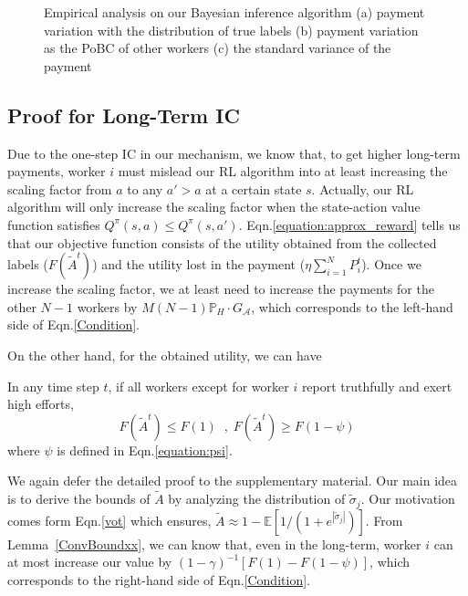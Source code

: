 \begin{figure}[!htb]
\begin{subfigure}[t]{0.32\textwidth}
        \caption{\label{BIM4}}
    \end{subfigure}
	\vspace{-3mm}
    \caption{\label{BIM}Empirical analysis on our Bayesian inference algorithm (a) payment variation with the distribution of true labels (b) payment variation as the PoBC of other workers (c) the standard variance of the payment}
\vspace{-4mm}
\end{figure}
\subsection{Proof for Long-Term IC}
Due to the one-step IC in our mechanism, we know that, to get higher long-term payments, worker $i$ must mislead our RL algorithm into at least increasing the scaling factor from $a$ to any $a'>a$ at a certain state $s$.
Actually, our RL algorithm will only increase the scaling factor when the state-action value function satisfies $Q^{\pi}(s,a)\leq Q^{\pi}(s,a')$.
Eqn.\ref{equation:approx_reward} tells us that our objective function consists of the utility obtained from the collected labels ($F(\tilde{A}^t)$) and the utility lost in the payment ($\eta {\sum}_{i=1}^{N}P^t_i$).
Once we increase the scaling factor, we at least need to increase the payments for the other $N-1$ workers by $M(N-1)\mathbb{P}_H\cdot G_{\mathcal{A}}$, which corresponds to the left-hand side of Eqn.\ref{Condition}.

On the other hand, for the obtained utility, we can have 
\begin{lemma}
\label{ConvBoundxx}
In any time step $t$, if all workers except for worker $i$ report truthfully and exert high efforts,
\begin{equation*}
F(\tilde{A}^t)\leq F(1) \;\;,\; F(\tilde{A}^t)\geq F(1-\psi)
\end{equation*}
where $\psi$ is defined in Eqn.\ref{equation:psi}.
\end{lemma}
We again defer the detailed proof to the supplementary material.
Our main idea is to derive the bounds of $\tilde{A}$ by analyzing the distribution of $\tilde{\sigma}_j$.
Our motivation comes form Eqn.\ref{vot} which ensures, $\tilde{A} \approx 1-\mathbb{E}[1/(1+e^{|\tilde{\sigma}_j|})]$. From Lemma~\ref{ConvBoundxx}, we can know that, even in the long-term, worker $i$ can at most increase our value by $(1-\gamma)^{-1}[F(1)-F(1-\psi)]$, which corresponds to the right-hand side of Eqn.\ref{Condition}.

